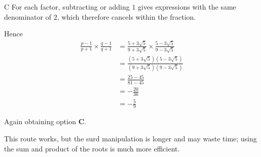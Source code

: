 \documentclass[11pt,a4paper]{article}
\begin{document}
\begin{enumerate}[label=\textbf{\arabic*.},leftmargin=*,itemsep=0pt,start=13]
\begin{djsSolution}{C}
For each factor, subtracting or adding $1$ gives expressions with the same denominator of $2$, which therefore cancels within the fraction. 

Hence
\begin{align*}
\frac{p-1}{p+1}\times\frac{q-1}{q+1}
&=
\frac{5+3\sqrt5}{9+3\sqrt5}
\times
\frac{5-3\sqrt5}{9-3\sqrt5} \\[7pt]
&=
\frac{(5+3\sqrt5)(5-3\sqrt5)}
     {(9+3\sqrt5)(9-3\sqrt5)} \\[7pt]
&=
\frac{25-45}{81-45} \\[7pt]
&=
-\frac{20}{36} \\[7pt]
&=
-\frac{5}{9}
\end{align*}

Again obtaining option \textbf{C}.

This route works, but the surd manipulation is longer and may waste time; using the sum and product of the roots is much more efficient.
\end{djsSolution}
\end{enumerate}
\clearpage
\thispagestyle{djssolutions}
\vspace*{8pt}
\end{document}
